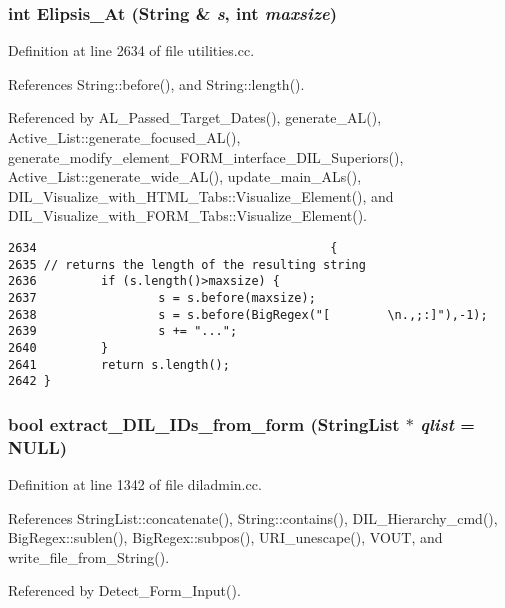 \subsubsection{\setlength{\rightskip}{0pt plus 5cm}int Elipsis\_\-At ({\bf String} \& {\em s}, int {\em maxsize})}\label{dil2al_8hh_a277}




Definition at line 2634 of file utilities.cc.

References String::before(), and String::length().

Referenced by AL\_\-Passed\_\-Target\_\-Dates(), generate\_\-AL(), Active\_\-List::generate\_\-focused\_\-AL(), generate\_\-modify\_\-element\_\-FORM\_\-interface\_\-DIL\_\-Superiors(), Active\_\-List::generate\_\-wide\_\-AL(), update\_\-main\_\-ALs(), DIL\_\-Visualize\_\-with\_\-HTML\_\-Tabs::Visualize\_\-Element(), and DIL\_\-Visualize\_\-with\_\-FORM\_\-Tabs::Visualize\_\-Element().



\footnotesize\begin{verbatim}2634                                         {
2635 // returns the length of the resulting string
2636         if (s.length()>maxsize) {
2637                 s = s.before(maxsize);
2638                 s = s.before(BigRegex("[        \n.,;:]"),-1);
2639                 s += "...";
2640         }
2641         return s.length();
2642 }
\end{verbatim}\normalsize 
{}
\subsubsection{\setlength{\rightskip}{0pt plus 5cm}bool extract\_\-DIL\_\-IDs\_\-from\_\-form ({\bf String\-List} $\ast$ {\em qlist} = NULL)}\label{dil2al_8hh_a310}




Definition at line 1342 of file diladmin.cc.

References String\-List::concatenate(), String::contains(), DIL\_\-Hierarchy\_\-cmd(), Big\-Regex::sublen(), Big\-Regex::subpos(), URI\_\-unescape(), VOUT, and write\_\-file\_\-from\_\-String().

Referenced by Detect\_\-Form\_\-Input().



